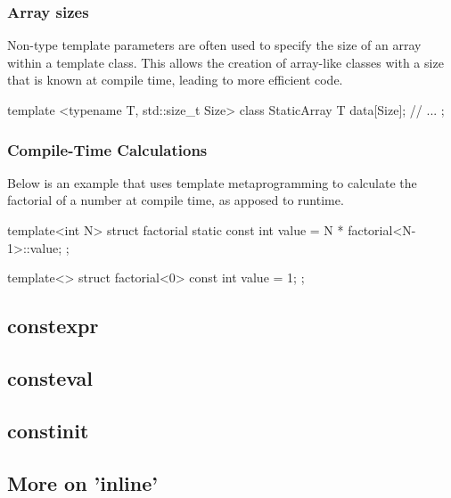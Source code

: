 \documentclass{report}
\begin{document}
\begin{concept}
    \bigbreak \noindent 
    \subsubsection{Array sizes}
    \bigbreak \noindent 
    Non-type template parameters are often used to specify the size of an array within a template class. This allows the creation of array-like classes with a size that is known at compile time, leading to more efficient code.
    \bigbreak \noindent 
    \begin{cppcode}
        template <typename T, std::size_t Size>
        class StaticArray {
            T data[Size];
            // ...
        };
    \end{cppcode}

    \pagebreak 
    \subsubsection{Compile-Time Calculations}
    Below is an example that uses template metaprogramming to calculate the factorial of a number at compile time, as apposed to runtime.
    \bigbreak \noindent 
    \begin{cppcode}
    template<int N>
    struct factorial {
        static const int value = N * factorial<N-1>::value;
    };

    template<>
    struct factorial<0> {
        const int value = 1;
    };
    \end{cppcode}

    \pagebreak 
    \bigbreak \noindent 

    \pagebreak 
    \bigbreak \noindent 
    \subsection{constexpr}
    \bigbreak \noindent 
    \subsection{consteval}
    \bigbreak \noindent 
    \subsection{constinit}

    \bigbreak \noindent 
    \subsection{More on 'inline'}


\end{concept}
\end{document}
